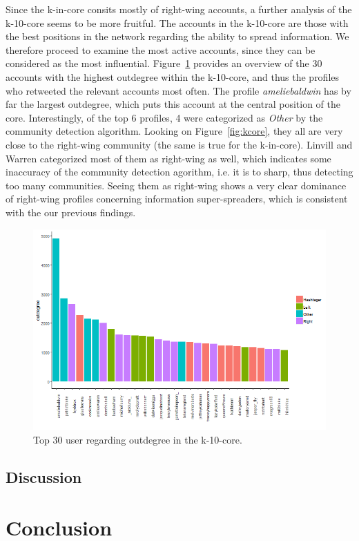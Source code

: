 \documentclass[12pt, titlepage=true, toc=bib]{scrartcl}
\begin{document}
Since the k-in-core consits mostly of right-wing accounts, a further analysis of the k-10-core seems to be more fruitful. The accounts in the k-10-core are those with the best positions in the network regarding the ability to spread information. We therefore proceed to examine the most active accounts, since they can be considered as the most influential. Figure~\ref{fig:k10in} provides an overview of the 30 accounts with the highest outdegree within the k-10-core, and thus the profiles who retweeted the relevant accounts most often. The profile \textit{ameliebaldwin} has by far the largest outdegree, which puts this account at the central position of the core. Interestingly, of the top 6 profiles, 4 were categorized as \textit{Other} by the community detection algorithm. Looking on Figure~\ref{fig:kcore}, they all are very close to the right-wing community (the same is true for the k-in-core). Linvill and Warren categorized most of them as right-wing as well, which indicates some inaccuracy of the community detection agorithm, i.e. it is to sharp, thus detecting too many communities. Seeing them as right-wing shows a very clear dominance of right-wing profiles concerning information super-spreaders, which is consistent with the our previous findings.

\begin{figure}[!ht]
\centering
\includegraphics[width=0.95\linewidth]{k10_figure}
\caption{Top 30 user regarding outdegree in the k-10-core.}
\label{fig:k10in}
\end{figure}


\subsection{Discussion}


\section{Conclusion}




\newpage

\printbibliography
\end{document}
